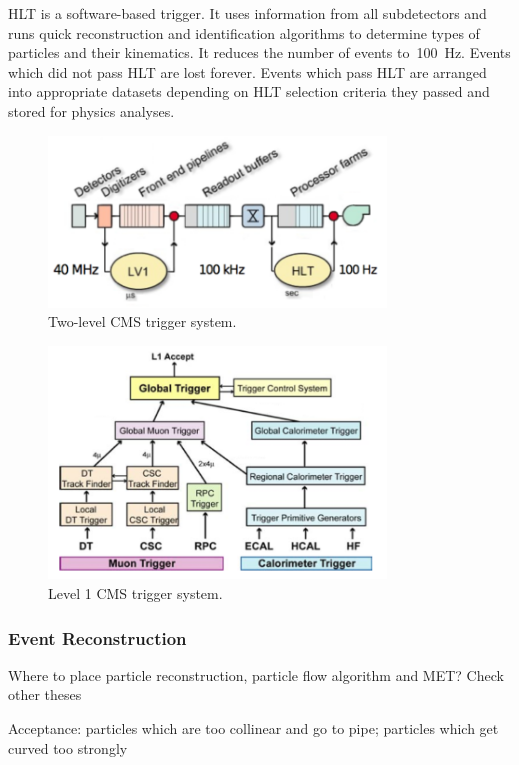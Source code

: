 HLT is a software-based trigger. It uses information from all subdetectors and runs quick reconstruction and identification algorithms to determine types of particles and their kinematics. It reduces the number of events to~100~Hz. Events which did not pass HLT are lost forever. Events which pass HLT are arranged into appropriate datasets depending on HLT selection criteria they passed and stored for physics analyses.\\

\begin{figure}[htb]
  \begin{center}
    \includegraphics[width=0.8\textwidth]{../figs/Exp/trigger_2level.png}
    \caption{Two-level CMS trigger system.}
    \label{fig:trigger_2level}
  \end{center}
\end{figure}

\begin{figure}[htb]
  \begin{center}
    \includegraphics[width=0.8\textwidth]{../figs/Exp/trigger_L1.png}
    \caption{Level 1 CMS trigger system.}
    \label{fig:trigger_L1}
  \end{center}
\end{figure}


\subsubsection{Event Reconstruction}
Where to place particle reconstruction, particle flow algorithm and MET? Check other theses

Acceptance: particles which are too collinear and go to pipe; particles which get curved too strongly
